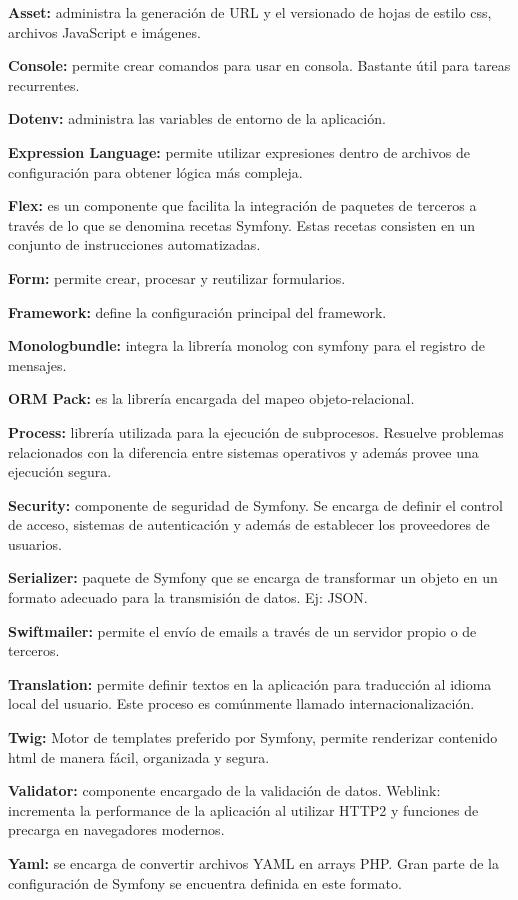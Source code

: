 \item \textbf{Asset:} administra la generación de URL y el versionado de hojas de estilo css, archivos JavaScript e imágenes.
\item \textbf{Console:} permite crear comandos para usar en consola. Bastante útil para tareas recurrentes.
\item \textbf{Dotenv:} administra las variables de entorno de la aplicación.
\item \textbf{Expression Language:} permite utilizar expresiones dentro de archivos de configuración para obtener lógica más compleja.
\item \label{itm:flex} \textbf{Flex:} es un componente que facilita la integración de paquetes de terceros a través de lo que se denomina recetas Symfony. Estas recetas consisten en un conjunto de instrucciones automatizadas.
\item \textbf{Form:} permite crear, procesar y reutilizar formularios.
\item \textbf{Framework:} define la configuración principal del framework.
\item \textbf{Monologbundle:} integra la librería monolog con symfony para el registro de mensajes.
\item \textbf{ORM Pack:} es la librería encargada del mapeo objeto-relacional.
\item \textbf{Process:} librería utilizada para la ejecución de subprocesos. Resuelve problemas relacionados con la diferencia entre sistemas operativos y además provee una ejecución segura.
\item \textbf{Security:} componente de seguridad de Symfony. Se encarga de definir el control de acceso, sistemas de autenticación y además de establecer los proveedores de usuarios.
\item \textbf{Serializer:} paquete de Symfony que se encarga de transformar un objeto en un formato adecuado para la transmisión de datos. Ej: JSON.
\item \textbf{Swiftmailer:} permite el envío de emails a través de un servidor propio o de terceros.
\item \textbf{Translation:} permite definir textos en la aplicación para traducción al idioma local del usuario. Este proceso es comúnmente llamado internacionalización.
\item \textbf{Twig:} Motor de templates preferido por Symfony, permite renderizar contenido html de manera fácil, organizada y segura.
\item \textbf{Validator:} componente encargado de la validación de datos. Weblink: incrementa la performance de la aplicación al utilizar HTTP2 y funciones de precarga en navegadores modernos.
\item \textbf{Yaml:} se encarga de convertir archivos YAML en arrays PHP. Gran parte de la configuración de Symfony se encuentra definida en este formato.

